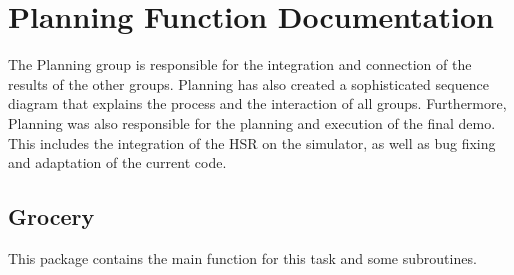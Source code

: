\documentclass[main.tex]{subfiles}
\begin{document}
	\begingroup

	\renewcommand{\cleardoublepage}{}

	\renewcommand{\clearpage}{}
	
	\newpage

	\chapter{Planning Function Documentation}

		
		The Planning group is responsible for the integration and connection of the results of the other groups. Planning has also created a sophisticated sequence diagram that explains the process and the interaction of all groups.
	    Furthermore, Planning was also responsible for the planning and execution of the final demo. This includes the integration of the HSR on the simulator, as well as bug fixing and adaptation of the current code.
		
		\section{Grocery}
		\label{grocery}
		This package contains the main function for this task and some subroutines.
\end{document}
